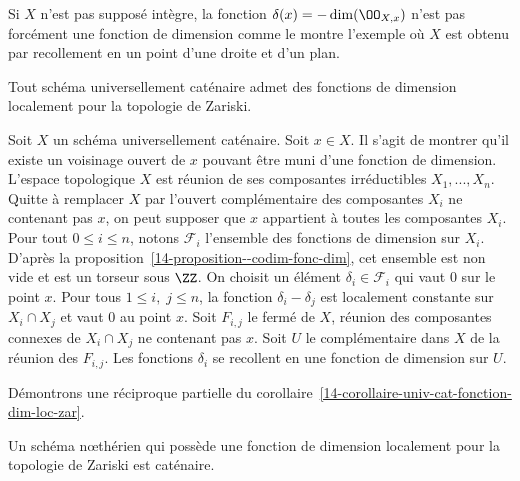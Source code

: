 \documentclass[10pt]{../fichiers-configuration-latex/smfart}
\begin{document}
\begin{remarque2} Si $X$ n'est pas supposé intègre, la fonction $\delta(x)=-\dim(\OO_{X,x})$ n'est
pas forcément une fonction de dimension comme le montre l'exemple où $X$ est obtenu par recollement
en un point d'une droite et d'un plan.  \end{remarque2}

\begin{corollaire2} \label{14-corollaire-univ-cat-fonction-dim-loc-zar} Tout schéma universellement
caténaire admet des fonctions de dimension localement pour la topologie de Zariski.
\end{corollaire2}


\begin{démo} Soit $X$ un schéma universellement caténaire. Soit $x\in X$. Il s'agit de montrer qu'il
existe un voisinage ouvert de $x$ pouvant être muni d'une fonction de dimension. L'espace
topologique $X$ est réunion de ses composantes irréductibles  $X_1,...,X_n$. Quitte à remplacer $X$
par l'ouvert complémentaire des  composantes $X_i$ ne contenant pas $x$, on peut supposer que $x$
appartient à toutes les composantes $X_i$.   Pour tout $0\leq i\leq n$,  notons $\mathscr{F}_i$
l'ensemble des fonctions de dimension sur $X_i$. D'après la
proposition~\ref{14-proposition--codim-fonc-dim}, cet ensemble est non vide et est un torseur sous
$\ZZ$. On choisit  un élément $\delta_i\in\mathscr{F}_i$ qui vaut $0$ sur le point $x$. Pour tous
$1\leq i , \; j \leq n$, la fonction $\delta_i-\delta_j$ est localement constante sur $X_i\cap X_j$
et vaut $0$ au point $x$. Soit $F_{i,j}$ le fermé de $X$, réunion des composantes connexes de
$X_i\cap X_j$ ne contenant pas $x$.  Soit $U$ le complémentaire dans $X$ de la réunion des
$F_{i,j}$.  Les fonctions $\delta_i$ se recollent en une fonction de dimension sur $U$.  \end{démo}

\medskip

Démontrons une réciproque  partielle du
corollaire~\ref{14-corollaire-univ-cat-fonction-dim-loc-zar}.

\begin{lemme2}\label{14-lemme-fonc-dim-cat} Un schéma nœthérien qui possède  une fonction de
dimension localement pour la topologie de Zariski est caténaire.  \end{lemme2}
\end{document}
